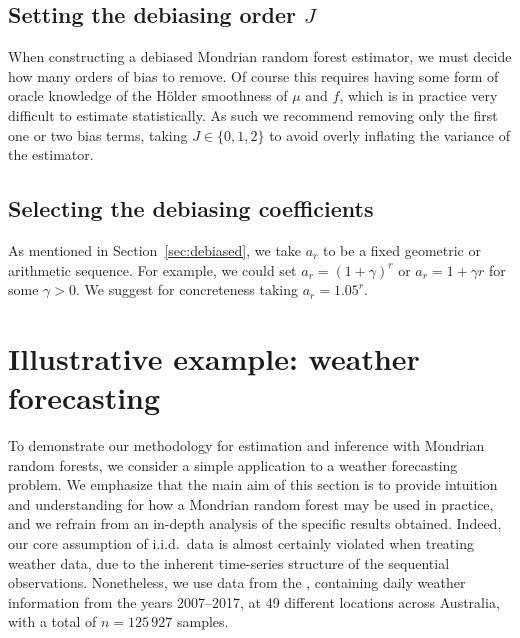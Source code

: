 \subsection{Setting the debiasing order \texorpdfstring{$J$}{J}}%

When constructing a debiased Mondrian random forest estimator, we must decide
how many orders of bias to remove. Of course this requires having some form of
oracle knowledge of the H{\"o}lder smoothness of $\mu$ and $f$, which is in
practice very difficult to estimate statistically. As such we recommend
removing only the first one or two bias terms, taking $J \in \{0,1,2\}$ to
avoid overly inflating the variance of the estimator.

\subsection{Selecting the debiasing coefficients}%

As mentioned in Section~\ref{sec:debiased}, we take $a_r$ to be a fixed
geometric or arithmetic sequence. For example, we could set
$a_r = (1+\gamma)^r$ or $a_r = 1 + \gamma r$ for some $\gamma > 0$. We suggest
for concreteness taking $a_r = 1.05^r$.

\section{Illustrative example: weather forecasting}%
\label{sec:mondrian_weather}

To demonstrate our methodology for estimation and inference with Mondrian random
forests, we consider a simple application
to a weather forecasting problem. We emphasize that the main aim of this
section is to provide intuition and understanding for how a Mondrian random
forest may be used in practice, and we refrain from an in-depth analysis of the
specific results obtained. Indeed, our core assumption of i.i.d.\ data is almost
certainly
violated when treating weather data, due to the inherent time-series structure
of the sequential observations.
Nonetheless, we use data from the \cite{bomgovau}, containing daily weather
information from the years 2007--2017, at 49 different
locations across Australia, with a total of $n = 125\,927$ samples.

